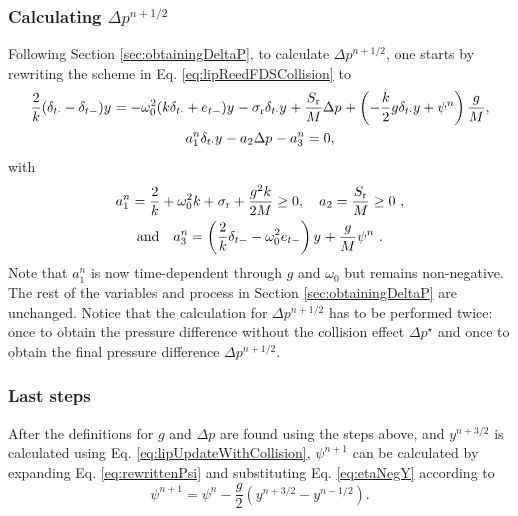 \subsubsection{Calculating $\Delta p^{n+1/2}$}
Following Section \ref{sec:obtainingDeltaP}, to calculate $\Delta p^{n+1/2}$, one starts by rewriting the scheme in Eq. \eqref{eq:lipReedFDSCollision} to
\begin{gather*}
    \frac{2}{k} (\delta_{t\cdot} - \delta_{t-})y^{} = -\omega_0^2(k\delta_{t\cdot} + e_{t-})y^{} - \sigma_\text{r}\delta_{t\cdot} y^{} + \frac{S_\text{r}}{M}\Delta p^{} + \left(-\frac{k}{2}g\delta_{t\cdot}y+\psi^n\right)\frac{g}{M},\\
    a_1^n\delta_{t\cdot}y^{} - a_2\Delta p^{} - a_3^n = 0,
\end{gather*}
with 
\begin{equation*}
    \begin{gathered}
    a_1^n = \frac{2}{k} + \omega_0^2k + \sigma_\text{r} + \frac{g^2k}{2M} \geq 0, \quad a_2 = \frac{S_\text{r}}{M} \geq 0\ , \\
     \text{and} \quad a_3^n = \left(\frac{2}{k} \delta_{t-} - \omega_0^2e_{t-}\right)y^{} + \frac{g}{M}\psi^n\ .
    \end{gathered}
\end{equation*}
Note that $a_1^n$ is now time-dependent through $g$ and $\omega_0$ but remains non-negative. The rest of the variables and process in Section \ref{sec:obtainingDeltaP} are unchanged. Notice that the calculation for $\Delta p^{n+1/2}$ has to be performed twice: once to obtain the pressure difference without the collision effect $\Delta p^\star$ and once to obtain the final pressure difference $\Delta p^{n+1/2}$.

\subsubsection{Last steps}
After the definitions for $g$ and $\Delta p$ are found using the steps above, and $y^{n+3/2}$ is calculated using Eq. \eqref{eq:lipUpdateWithCollision}, $\psi^{n+1}$ can be calculated by expanding Eq. \eqref{eq:rewrittenPsi} and substituting Eq. \eqref{eq:etaNegY} according to
\begin{equation}\label{eq:psiUpdate}
    \psi^{n+1} = \psi^n - \frac{g}{2}\left(y^{n+3/2} - y^{n-1/2}\right).
\end{equation}

